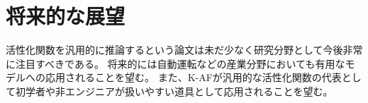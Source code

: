 \section{将来的な展望}

活性化関数を汎用的に推論するという論文は未だ少なく研究分野として今後非常に注目すべきである。 
将来的には自動運転などの産業分野においても有用なモデルへの応用されることを望む。
また、K-AFが汎用的な活性化関数の代表として初学者や非エンジニアが扱いやすい道具として応用されることを望む。


